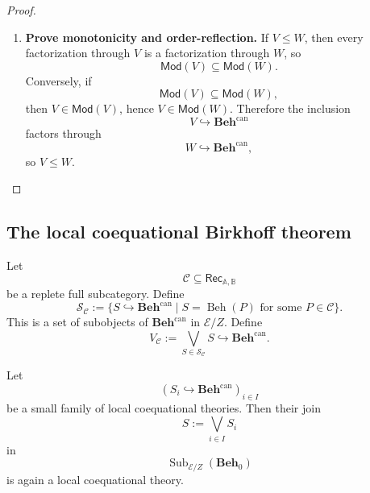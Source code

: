 \begin{proof}
\begin{enumerate}
        \item \textbf{Prove monotonicity and order-reflection.}
        If \(V\leq W\), then every factorization through \(V\) is a
        factorization through \(W\), so
        \[
            \mathsf{Mod}(V)\subseteq\mathsf{Mod}(W).
        \]
        Conversely, if
        \[
            \mathsf{Mod}(V)\subseteq\mathsf{Mod}(W),
        \]
        then \(V\in\mathsf{Mod}(V)\), hence \(V\in\mathsf{Mod}(W)\). Therefore
        the inclusion
        \[
            V\hookrightarrow\mathbf{Beh}^{\mathrm{can}}
        \]
        factors through
        \[
            W\hookrightarrow\mathbf{Beh}^{\mathrm{can}},
        \]
        so \(V\leq W\).
    \end{enumerate}
\end{proof}

\subsection{The local coequational Birkhoff theorem}
\label{subsec:local-coequational-birkhoff}

Let
\[
    \mathcal C\subseteq\mathsf{Rec}_{\mathbb A,\mathbb B}
\]
be a replete full subcategory. Define
\[
    \mathcal S_{\mathcal C}
    :=
    \{
        S\hookrightarrow\mathbf{Beh}^{\mathrm{can}}
        \mid
        S=\operatorname{Beh}(P)
        \text{ for some }P\in\mathcal C
    \}.
\]
This is a set of subobjects of \(\mathbf{Beh}^{\mathrm{can}}\) in
\(\mathcal E/Z\). Define
\[
    V_{\mathcal C}
    :=
    \bigvee_{S\in\mathcal S_{\mathcal C}}S
    \hookrightarrow\mathbf{Beh}^{\mathrm{can}}.
\]

\begin{lemma}
\label{lem:joins-derivative-closed}
    Let
    \[
        (S_i\hookrightarrow\mathbf{Beh}^{\mathrm{can}})_{i\in I}
    \]
    be a small family of local coequational theories. Then their join
    \[
        S:=\bigvee_{i\in I}S_i
    \]
    in
    \[
        \operatorname{Sub}_{\mathcal E/Z}(\mathbf{Beh}_0)
    \]
    is again a local coequational theory.
\end{lemma}

